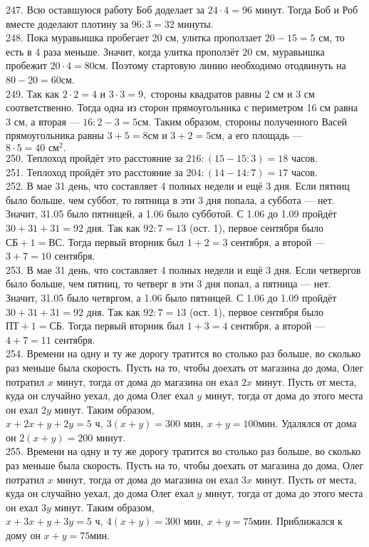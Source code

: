 247. Всю оставшуюся работу Боб доделает за $24\cdot4=96$ минут. Тогда Боб и Роб вместе доделают плотину за $96:3=32$ минуты.\\
248. Пока муравьишка пробегает 20 см, улитка проползает $20-15=5$ см, то есть в 4 раза меньше. Значит, когда улитка проползёт 20 см, муравьишка пробежит $20\cdot4=80$см. Поэтому стартовую линию необходимо отодвинуть на $80-20=60$см.\\
249. Так как $2\cdot2=4$ и $3\cdot3=9,$ стороны квадратов равны 2 см и 3 см соответственно. Тогда одна из сторон прямоугольника с периметром 16 см равна 3 см, а вторая --- $16:2-3=5$см. Таким образом, стороны полученного Васей прямоугольника равны $3+5=8$см и $3+2=5$см, а его площадь --- $8\cdot5=40\text{ см}^2.$\\
250. Теплоход пройдёт это расстояние за $216:(15-15:3)=18$ часов.\\
251. Теплоход пройдёт это расстояние за $204:(14-14:7)=17$ часов.\\
252. В мае 31 день, что составляет 4 полных недели и ещё 3 дня. Если пятниц было больше, чем суббот, то пятница в эти 3 дня попала, а суббота --- нет. Значит, 31.05 было пятницей, а 1.06 было субботой. С 1.06 до 1.09 пройдёт $30+31+31=92$ дня. Так как $92:7=13$ (ост. 1), первое сентября было $\text{СБ}+1=\text{ВС}.$ Тогда первый вторник был $1+2=3$ сентября, а второй --- $3+7=10$ сентября.\\
253. В мае 31 день, что составляет 4 полных недели и ещё 3 дня. Если четвергов было больше, чем пятниц, то четверг в эти 3 дня попал, а пятница --- нет. Значит, 31.05 было четвргом, а 1.06 было пятницей. С 1.06 до 1.09 пройдёт $30+31+31=92$ дня. Так как $92:7=13$ (ост. 1), первое сентября было $\text{ПТ}+1=\text{СБ}.$ Тогда первый вторник был $1+3=4$ сентября, а второй --- $4+7=11$ сентября.\\
254. Времени на одну и ту же дорогу тратится во столько раз больше, во сколько раз меньше была скорость. Пусть на то, чтобы доехать от магазина до дома, Олег потратил $x$ минут, тогда от дома до магазина он ехал $2x$ минут. Пусть от места, куда он случайно уехал, до дома Олег ехал $y$ минут, тогда от дома до этого места он ехал $2y$ минут. Таким образом, $x+2x+y+2y=5\text{ ч},\ 3(x+y)=300\text{ мин},\ x+y=100$мин. Удалялся от дома он $2(x+y)=200$ минут.\\
255. Времени на одну и ту же дорогу тратится во столько раз больше, во сколько раз меньше была скорость. Пусть на то, чтобы доехать от магазина до дома, Олег потратил $x$ минут, тогда от дома до магазина он ехал $3x$ минут. Пусть от места, куда он случайно уехал, до дома Олег ехал $y$ минут, тогда от дома до этого места он ехал $3y$ минут. Таким образом, $x+3x+y+3y=5\text{ ч},\ 4(x+y)=300\text{ мин},\ x+y=75$мин. Приближался к дому он $x+y=75$мин.\\
